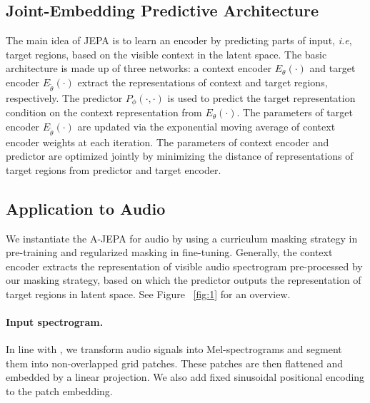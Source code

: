 \documentclass{article}
\begin{document}
\subsection{Joint-Embedding Predictive Architecture} 
The main idea of JEPA is to learn an encoder by predicting parts of input, \emph{i.e}, target regions, based on the visible context in the latent space. 
The basic architecture is made up of three networks: a context encoder $E_\theta(\cdot)$ and target encoder $E_{\tilde{\theta}}(\cdot)$ extract the representations of context and target regions, respectively. 
The predictor $P_\phi(\cdot, \cdot)$ is used to predict the target representation condition on the context representation from $E_\theta(\cdot)$.
The parameters of target encoder $E_{\tilde{\theta}}(\cdot)$ are updated via the exponential moving average of context encoder weights at each iteration.
The parameters of context encoder and predictor are optimized jointly by minimizing the distance of representations of target regions from predictor and target encoder. 

\subsection{Application to Audio}

We instantiate the A-JEPA for audio by using a curriculum masking strategy in pre-training and regularized masking in fine-tuning. 
Generally, the context encoder extracts the representation of visible audio spectrogram pre-processed by our masking strategy, based on which the predictor outputs the representation of target regions in latent space. 
See Figure ~\ref{fig:1} for an overview. 


\paragraph{Input spectrogram.}

In line with \cite{gong2021ast,gong2022ssast,huang2022masked}, we transform audio signals into Mel-spectrograms and segment them into non-overlapped grid patches. These patches are then flattened and embedded by a linear projection. We also add fixed sinusoidal positional encoding to the patch embedding. 
\end{document}
